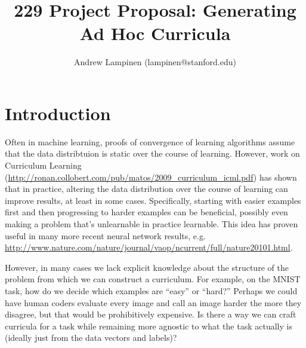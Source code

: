 \documentclass[11pt]{article}
\begin{document}
 
\setcounter{secnumdepth}{1}
\title{229 Project Proposal: Generating Ad Hoc Curricula}
\author{Andrew Lampinen (lampinen@stanford.edu)}
\date{}
\maketitle

\section{Introduction}
Often in machine learning, proofs of convergence of learning algorithms assume that the data distribtuion is static over the course of learning. However, work on Curriculum Learning (\url{http://ronan.collobert.com/pub/matos/2009_curriculum_icml.pdf}) has shown that in practice, altering the data distribution over the course of learning can improve results, at least in some cases. Specifically, starting with easier examples first and then progressing to harder examples can be beneficial, possibly even making a problem that's unlearnable in practice learnable. This idea has proven useful in many more recent neural network results, e.g. \url{http://www.nature.com/nature/journal/vaop/ncurrent/full/nature20101.html}.\par
However, in many cases we lack explicit knowledge about the structure of the problem from which we can construct a curriculum. For example, on the MNIST task, how do we decide which examples are ``easy'' or ``hard?'' Perhaps we could have human coders evaluate every image and call an image harder the more they disagree, but that would be prohibitively expensive. Is there a way we can craft curricula for a task while remaining more agnostic to what the task actually is (ideally just from the data vectors and labels)?
\end{document}
